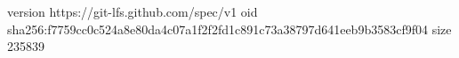 version https://git-lfs.github.com/spec/v1
oid sha256:f7759cc0c524a8e80da4c07a1f2f2fd1c891c73a38797d641eeb9b3583cf9f04
size 235839
